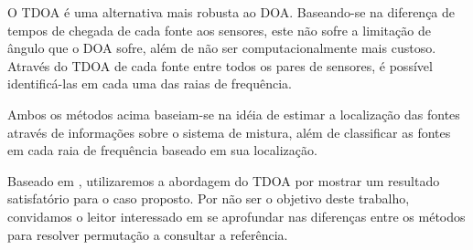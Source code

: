     O TDOA é uma alternativa mais robusta ao DOA. Baseando-se na diferença de tempos de chegada de cada fonte aos sensores, este não sofre a limitação de ângulo que o DOA sofre, além de não ser computacionalmente mais custoso. Através do TDOA de cada fonte entre todos os pares de sensores, é possível identificá-las em cada uma das raias de frequência.
    
    Ambos os métodos acima baseiam-se na idéia de estimar a localização das fontes através de informações sobre o sistema de mistura, além de classificar as fontes em cada raia de frequência baseado em sua localização.
    
    Baseado em \cite{LuizVictorio}, utilizaremos a abordagem do TDOA por mostrar um resultado satisfatório para o caso proposto. Por não ser o objetivo deste trabalho, convidamos o leitor interessado em se aprofundar nas diferenças entre os métodos para resolver permutação a consultar a referência.